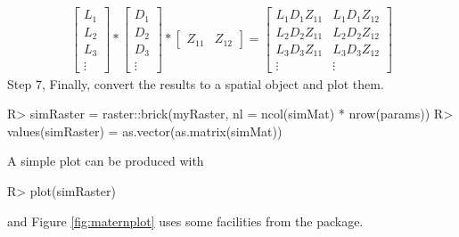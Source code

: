 \documentclass[article,nojss]{jss}\usepackage[]{graphicx}\usepackage[]{color}
\begin{document}
\begin{gather}
 \begin{bmatrix}  L_{1} \\ L_{2} \\L_{3} \\ \vdots
 \end{bmatrix} 
 *
  \begin{bmatrix}
   D_{1} \\ D_{2} \\D_{3} \\ \vdots
   \end{bmatrix} 
   *
   \begin{bmatrix}
   Z_{11} & Z_{12}
   \end{bmatrix}
  =
 \begin{bmatrix}
   L_1D_1Z_{11} & L_1D_1Z_{12} \\
   L_2D_2Z_{11} & L_2D_2Z_{12} \\
   L_3D_3Z_{11} & L_3D_3Z_{12} \\
   \vdots  &   \vdots
  \end{bmatrix}
\end{gather}
Step 7, Finally, convert the results to a spatial  object and plot them.
\begin{CodeChunk}
\begin{CodeInput}
R> simRaster = raster::brick(myRaster, nl = ncol(simMat) * nrow(params))
R> values(simRaster) = as.vector(as.matrix(simMat))
\end{CodeInput} 
\end{CodeChunk} 

A simple plot can be produced with
\begin{CodeChunk}
\begin{CodeInput}
R> plot(simRaster)
\end{CodeInput} 
\end{CodeChunk} 

and Figure \ref{fig:maternplot} uses some facilities from the  \citep{mapmiscPackage} package.
\end{document}
